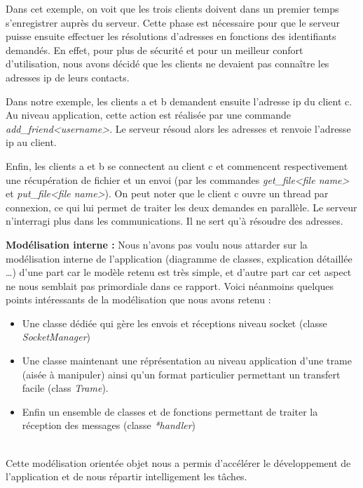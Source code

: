 \documentclass[a4paper, 11pt, french]{report}
\begin{document}
	Dans cet exemple, on voit que les trois clients doivent dans un premier temps s'enregistrer auprès du serveur. Cette phase est nécessaire pour que le serveur puisse ensuite effectuer les résolutions d'adresses en fonctions des identifiants demandés. En effet, pour plus de sécurité et pour un meilleur confort d'utilisation, nous avons décidé que les clients ne devaient pas connaître les adresses ip de leurs contacts.
	\newline

	Dans notre exemple, les clients a et b demandent ensuite l'adresse ip du client c. Au niveau application, cette action est réalisée par une commande \emph{add\_friend<username>}. Le serveur résoud alors les adresses et renvoie l'adresse ip au client.
	\newline

	Enfin, les clients a et b se connectent au client c et commencent respectivement une récupération de fichier et un envoi (par les commandes \emph{get\_file<file name>} et \emph{put\_file<file name>}). On peut noter que le client c ouvre un thread par connexion, ce qui lui permet de traiter les deux demandes en parallèle.
	\newline
	Le serveur n'interragi plus dans les communications. Il ne sert qu'à résoudre des adresses.

	\textbf{Modélisation interne :} Nous n'avons pas voulu nous attarder sur la modélisation interne de l'application (diagramme de classes, explication détaillée \ldots) d'une part car le modèle retenu est très simple, et d'autre part car cet aspect ne nous semblait pas primordiale dans ce rapport. Voici néanmoins quelques points intéressants de la modélisation que nous avons retenu :
		~\\
		\begin{itemize}
			\item Une classe dédiée qui gère les envois et réceptions niveau socket (classe \emph{SocketManager})
			\item Une classe maintenant une réprésentation au niveau application d'une trame (aisée à manipuler) ainsi qu'un format particulier permettant un transfert facile (class \emph{Trame}).
			\item Enfin un ensemble de classes et de fonctions permettant de traiter la réception des messages (classe \emph{*handler})
		\end{itemize}
		~\\

		Cette modélisation orientée objet nous a permis d'accélérer le développement de l'application et de nous répartir intelligement les tâches.
\end{document}
